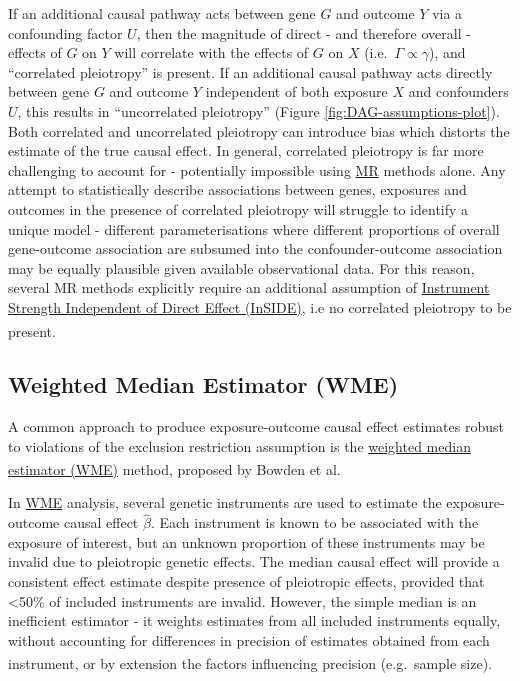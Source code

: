 \documentclass[
]{article}
\begin{document}
If an additional causal pathway acts between gene \(G\) and outcome \(Y\) via a confounding factor \(U\), then the magnitude of direct - and therefore overall - effects of \(G\) on \(Y\) will correlate with the effects of \(G\) on \(X\) (i.e.~\(\Gamma \propto \gamma\)), and ``correlated pleiotropy'' is present. If an additional causal pathway acts directly between gene \(G\) and outcome \(Y\) independent of both exposure \(X\) and confounders \(U\), this results in ``uncorrelated pleiotropy'' (Figure \ref{fig:DAG-assumptions-plot}). Both correlated and uncorrelated pleiotropy can introduce bias which distorts the estimate of the true causal effect. In general, correlated pleiotropy is far more challenging to account for - potentially impossible using \hyperref[acronyms_MR]{MR} methods alone. Any attempt to statistically describe associations between genes, exposures and outcomes in the presence of correlated pleiotropy will struggle to identify a unique model - different parameterisations where different proportions of overall gene-outcome association are subsumed into the confounder-outcome association may be equally plausible given available observational data. For this reason, several MR methods explicitly require an additional assumption of \hyperref[acronyms_InSIDE]{Instrument Strength Independent of Direct Effect (InSIDE)}, i.e no correlated pleiotropy to be present\textsuperscript{}.

\subsection{Weighted Median Estimator (WME)}\label{weighted-median-estimator-wme}

A common approach to produce exposure-outcome causal effect estimates robust to violations of the exclusion restriction assumption is the \hyperref[acronyms_WME]{weighted median estimator (WME)} method, proposed by Bowden et al\textsuperscript{}.

In \hyperref[acronyms_WME]{WME} analysis, several genetic instruments are used to estimate the exposure-outcome causal effect \(\hat{\beta}\). Each instrument is known to be associated with the exposure of interest, but an unknown proportion of these instruments may be invalid due to pleiotropic genetic effects. The median causal effect will provide a consistent effect estimate despite presence of pleiotropic effects, provided that \textless50\% of included instruments are invalid. However, the simple median is an inefficient estimator - it weights estimates from all included instruments equally, without accounting for differences in precision of estimates obtained from each instrument, or by extension the factors influencing precision (e.g.~sample size)\textsuperscript{}.
\end{document}
